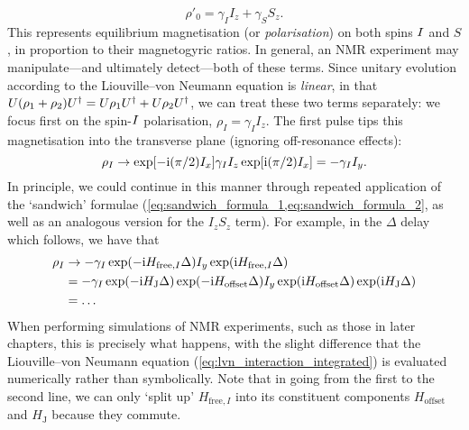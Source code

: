\begin{equation}
    \label{eq:density_eqm_heteronuclear_simplified}
    \rho'_0 = \gamma_I I_z + \gamma_S S_z.
\end{equation}
This represents equilibrium magnetisation (or \textit{polarisation}) on both spins $I\/$ and $S$, in proportion to their magnetogyric ratios.
In general, an NMR experiment may manipulate---and ultimately detect---both of these terms.
Since unitary evolution according to the Liouville--von Neumann equation is \textit{linear}, in that $U(\rho_1 + \rho_2)U^\dagger = U\rho_1U^\dagger + U\rho_2U^\dagger$, we can treat these two terms separately: we focus first on the spin-$I\/$ polarisation, $\rho_I = \gamma_I I_z$.
The first  \proton{} pulse tips this magnetisation into the transverse plane (ignoring off-resonance effects):
\begin{equation}
    \label{eq:rho_after_pulse_x}
    \rho_I \to \exp[-\mathrm{i}(\pi/2) I_x] \gamma_I I_z \exp[\mathrm{i}(\pi/2) I_x] = -\gamma_I I_y.
\end{equation}
In principle, we could continue in this manner through repeated application of the `sandwich' formulae (\cref{eq:sandwich_formula_1,eq:sandwich_formula_2}, as well as an analogous version for the $I_zS_z$ term). 
For example, in the $\Delta$ delay which follows, we have that
\begin{equation}
    \label{eq:rho_after_delay_x}
    \begin{aligned}
        \rho_I &\to -\gamma_I\exp(-\mathrm{i} H_{\text{free},I} \Delta) I_y \exp(\mathrm{i} H_{\text{free},I} \Delta) \\
               &= -\gamma_I\exp(-\mathrm{i} H_\text{J} \Delta)\exp(-\mathrm{i} H_\text{offset}\Delta) I_y \exp(\mathrm{i} H_\text{offset} \Delta)\exp(\mathrm{i} H_\text{J}\Delta) \\
               &= \ldots
    \end{aligned}
\end{equation}
When performing simulations of NMR experiments, such as those in later chapters, this is precisely what happens, with the slight difference that the Liouville--von Neumann equation (\cref{eq:lvn_interaction_integrated}) is evaluated numerically rather than symbolically.
Note that in going from the first to the second line, we can only `split up' $H_{\text{free},I}$ into its constituent components $H_\text{offset}$ and $H_\text{J}$ because they commute.

